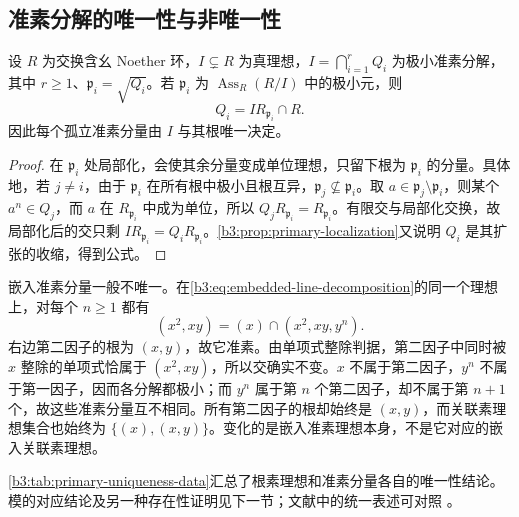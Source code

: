 \subsection{准素分解的唯一性与非唯一性}
\label{b3:subsec:0403:03}

\begin{theorem}\label{b3:thm:primary-isolated-uniqueness}
	设 \(R\) 为交换含幺 Noether 环，\(I\subsetneq R\) 为真理想，\(I=\bigcap_{i=1}^rQ_i\) 为极小准素分解，其中 \(r\ge1\)、\(\mathfrak p_i=\sqrt{Q_i}\)。若 \(\mathfrak p_i\) 为 \(\operatorname{Ass}_R(R/I)\) 中的极小元，则
	\[
		Q_i=IR_{\mathfrak p_i}\cap R.
	\]
	因此每个孤立准素分量由 \(I\) 与其根唯一决定。
\end{theorem}
\begin{proof}
	在 \(\mathfrak p_i\) 处局部化，会使其余分量变成单位理想，只留下根为 \(\mathfrak p_i\) 的分量。具体地，若 \(j\ne i\)，由于 \(\mathfrak p_i\) 在所有根中极小且根互异，\(\mathfrak p_j\not\subseteq\mathfrak p_i\)。取 \(a\in\mathfrak p_j\setminus\mathfrak p_i\)，则某个 \(a^n\in Q_j\)，而 \(a\) 在 \(R_{\mathfrak p_i}\) 中成为单位，所以 \(Q_jR_{\mathfrak p_i}=R_{\mathfrak p_i}\)。有限交与局部化交换，故局部化后的交只剩 \(IR_{\mathfrak p_i}=Q_iR_{\mathfrak p_i}\)。\cref{b3:prop:primary-localization}又说明 \(Q_i\) 是其扩张的收缩，得到公式。
\end{proof}

嵌入准素分量一般不唯一。在\cref{b3:eq:embedded-line-decomposition}的同一个理想上，对每个 \(n\ge1\) 都有
\begin{equation}\label{b3:eq:nonunique-embedded-components}
	(x^2,xy)=(x)\cap(x^2,xy,y^n).
\end{equation}
右边第二因子的根为 \((x,y)\)，故它准素。由单项式整除判据，第二因子中同时被 \(x\) 整除的单项式恰属于 \((x^2,xy)\)，所以交确实不变。\(x\) 不属于第二因子，\(y^n\) 不属于第一因子，因而各分解都极小；而 \(y^n\) 属于第 \(n\) 个第二因子，却不属于第 \(n+1\) 个，故这些准素分量互不相同。所有第二因子的根却始终是 \((x,y)\)，而关联素理想集合也始终为 \(\{(x),(x,y)\}\)。变化的是嵌入准素理想本身，不是它对应的嵌入关联素理想。

\ProseParagraphBreak
\cref{b3:tab:primary-uniqueness-data}汇总了根素理想和准素分量各自的唯一性结论。模的对应结论及另一种存在性证明见下一节；文献中的统一表述可对照 \cite[\S6, Theorem 6.8]{Matsumura1989CommutativeRingTheory}。

